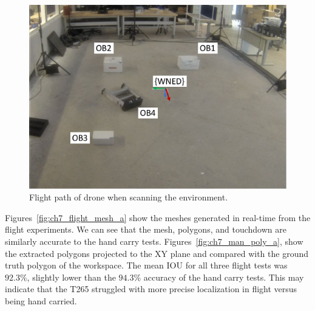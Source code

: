 \begin{figure}[!tb]
    \centering  
    \includegraphics[page=3,clip,trim=0cm 0cm 0cm 0cm,width=.45\linewidth]{chapter_7_experiments/imgs/ExperimentSetup.pdf}
    \caption[Flight path of drone when scanning the environment.]{Flight path of drone when scanning the environment.}\label{fig:ch7_flight_path}
\end{figure}

Figures~\ref{fig:ch7_flight_mesh_a} show the meshes generated in real-time from the flight experiments. We can see that the mesh, polygons, and touchdown are similarly accurate to the hand carry tests. Figures~\ref{fig:ch7_man_poly_a}, show the extracted polygons projected to the XY plane and compared with the ground truth polygon of the workspace. The mean \ac{IOU} for all three flight tests was $92.3\%$, slightly lower than the $94.3$\% accuracy of the hand carry tests.  This may indicate that the T265 struggled with more precise localization in flight versus being hand carried. 


